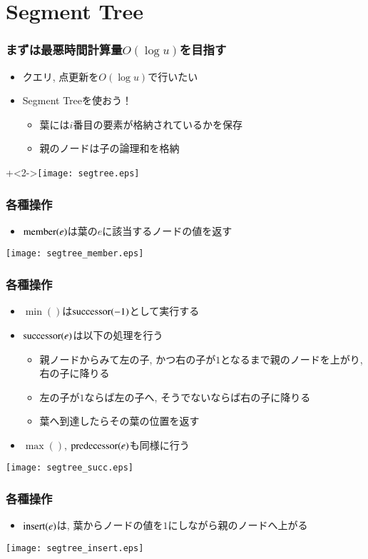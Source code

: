 \documentclass[dvipdfmx,12pt,notheorems]{beamer}
\theoremstyle{definition}
\newcommand{\func}[1]{\ensuremath\mathrm{#1}}
\begin{document}
\section{Segment Tree}
\begin{frame}\frametitle{まずは最悪時間計算量$O(\log u)$を目指す}
\begin{itemize}
\item クエリ, 点更新を$O(\log u)$で行いたい
\item Segment Treeを使おう！
\begin{itemize}
\item 葉には$i$番目の要素が格納されているかを保存
\item 親のノードは子の論理和を格納
\end{itemize}
\end{itemize}
\onslide+<2->{\texttt{[image: segtree.eps]}}
\end{frame}

\begin{frame}\frametitle{各種操作}
\begin{itemize}
\item $\func{member}(e)$は葉の$e$に該当するノードの値を返す
\end{itemize}
\texttt{[image: segtree\_member.eps]}
\end{frame}

\begin{frame}\frametitle{各種操作}
\begin{itemize}
\item $\min()$は$\func{successor}(-1)$として実行する
\item $\func{successor}(e)$は以下の処理を行う
\begin{itemize}
\item 親ノードからみて左の子, かつ右の子が$1$となるまで親のノードを上がり, 右の子に降りる
\item 左の子が$1$ならば左の子へ, そうでないならば右の子に降りる
\item 葉へ到達したらその葉の位置を返す
\end{itemize}
\item $\max()$, $\func{predecessor}(e)$も同様に行う
\end{itemize}
\texttt{[image: segtree\_succ.eps]}
\end{frame}

\begin{frame}\frametitle{各種操作}
\begin{itemize}
\item $\func{insert}(e)$は, 葉からノードの値を$1$にしながら親のノードへ上がる
\end{itemize}
\texttt{[image: segtree\_insert.eps]}
\end{frame}
\end{document}
